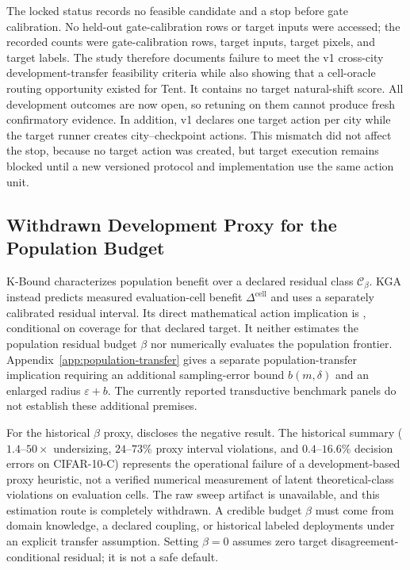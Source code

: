 The locked status records no feasible candidate and a stop before gate calibration. No held-out
gate-calibration rows or target inputs were accessed; the recorded counts were
\SoTwoGateCalRowsRead{} gate-calibration rows, \SoTwoTargetInputCount{} target inputs,
\SoTwoTargetPixelsRead{} target pixels, and \SoTwoTargetLabelsRead{} target labels. The study
therefore documents failure to meet the v1 cross-city development-transfer feasibility criteria
while also showing that a cell-oracle routing opportunity existed for Tent. It contains no target natural-shift
score. All \SoTwoOpenedOutcomeCount{}
development outcomes are now open, so retuning on them cannot produce fresh confirmatory evidence.
In addition, v1 declares one
target action per city while the target runner creates city--checkpoint actions. This mismatch did
not affect the stop, because no target action was created, but target execution remains blocked until
a new versioned protocol and implementation use the same action unit.

\subsection{Withdrawn Development Proxy for the Population Budget}
\label{app:withdrawn-beta-proxy}

K-Bound characterizes population benefit over a declared residual class $\mathcal C_\beta$.
KGA instead predicts measured evaluation-cell benefit $\Delta^{\mathrm{cell}}$ and uses a separately
calibrated residual interval. Its direct mathematical action implication is
, conditional on coverage for that declared target.
It neither estimates the population residual budget $\beta$ nor numerically evaluates the population
frontier. Appendix~\ref{app:population-transfer} gives a separate population-transfer implication
requiring an additional sampling-error bound $b(m,\delta)$ and an enlarged radius $\varepsilon+b$.
The currently reported transductive benchmark panels do not establish these additional premises.

For the historical $\beta$ proxy,  discloses the negative result.
The historical summary ($1.4$--$50\times$ undersizing, $24$--$73\%$ proxy interval violations,
and $0.4$--$16.6\%$ decision errors on CIFAR-10-C) represents the operational failure of a development-based
proxy heuristic, not a verified numerical measurement of latent theoretical-class violations on evaluation cells.
The raw sweep artifact is unavailable, and this estimation route is completely withdrawn. A credible
budget $\beta$ must come from domain knowledge, a declared coupling, or historical labeled deployments
under an explicit transfer assumption. Setting $\beta=0$ assumes zero target disagreement-conditional
residual; it is not a safe default.

